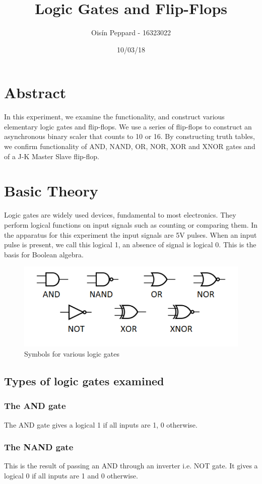 \documentclass{article}
\title{Logic Gates and Flip-Flops}
\author{Oisín Peppard - 16323022}
\date{10/03/18}
\begin{document}
\maketitle

\section{Abstract}
In this experiment, we examine the functionality, and construct various elementary logic gates and flip-flops. We use a series of flip-flops to construct an asynchronous binary scaler that counts to 10 or 16. By constructing truth tables, we confirm functionality of AND, NAND, OR, NOR, XOR and XNOR gates and of a J-K Master Slave flip-flop.

\section{Basic Theory}
Logic gates are widely used devices, fundamental to most electronics. They perform logical functions on input signals such as counting or comparing them. In the apparatus for this experiment the input signals are 5V pulses. When an input pulse is present, we call this logical 1, an absence of signal is logical 0. This is the basis for Boolean algebra.

\begin{figure}[h!]
\centering
\includegraphics[width=\textwidth]{gates}
\caption{Symbols for various logic gates}
\label{fig:1}
\end{figure}

\subsection*{Types of logic gates examined}
\subsubsection*{The AND gate}
The AND gate gives a logical 1 if all inputs are 1, 0 otherwise.
\subsubsection*{The NAND gate}
This is the result of passing an AND through an inverter i.e. NOT gate. It gives a logical 0 if all inputs are 1 and 0 otherwise.
\end{document}
